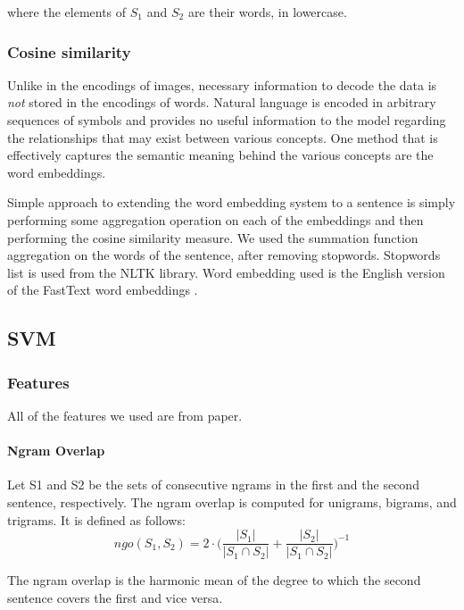 \documentclass[10pt, a4paper]{article}
\begin{document}
\begin{table}[h!]
where the elements of $S_1$ and $S_2$ are their words, in lowercase.

\subsubsection{Cosine similarity}

Unlike in the encodings of images, necessary information to decode the data is \textit{not} stored in the encodings of words.
Natural language is encoded in arbitrary sequences of symbols and provides no useful information to the model regarding the relationships that may exist between various concepts.
One method that is effectively captures the semantic meaning behind the various concepts are the word embeddings.

Simple approach to extending the word embedding system to a sentence is simply performing some aggregation operation on each of the embeddings and then performing the cosine similarity measure.
We used the summation function aggregation on the words of the sentence, after removing stopwords.
Stopwords list is used from the NLTK library.
Word embedding used is the English version of the FastText word embeddings \citep{joulin2016fasttext}.

\subsection{SVM}

\subsubsection{Features}
All of the features we used are from \citep{Saric2012TakeLabSF} paper.
\paragraph{Ngram Overlap \\}
Let S1 and S2 be the sets of consecutive ngrams in the first and the second sentence, respectively. The ngram overlap is computed for unigrams, bigrams, and trigrams. It is defined as follows:
\begin{equation}\label{eq:ngo}
ngo(S_1, S_2) = 2 \cdot \bigg( \frac{|S_1|}{|S_1 \cap S_2|}+\frac{|S_2|}{|S_1 \cap S_2|}\bigg)^{-1}
\end{equation}

The ngram overlap is the harmonic mean of the degree
to which the second sentence covers the first
and vice versa.\citep{Saric2012TakeLabSF}


\end{table}
\end{document}
